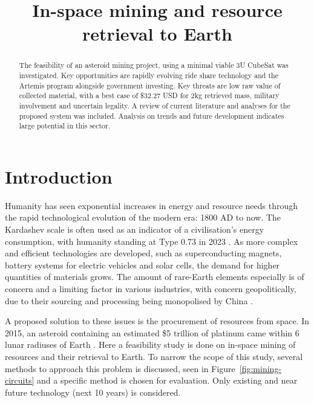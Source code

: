 \documentclass[conference]{IEEEtran}
\begin{document}
\title{In-space mining and resource retrieval to Earth}

\author{
}

\maketitle

\begin{abstract}
The feasibility of an asteroid mining project, using a minimal viable 3U CubeSat was investigated. Key opportunities are rapidly evolving ride share technology and the Artemis program alongside government investing. Key threats are low raw value of collected material, with a best case of \$32.27 USD for 2kg retrieved mass, military involvement and uncertain legality. A review of current literature and analyses for the proposed system was included. Analysis on trends and future development indicates large potential in this sector.
\end{abstract}

\section{Introduction}
Humanity has seen exponential increases in energy and resource needs through the rapid technological evolution of the modern era: 1800 AD to now. The Kardashev scale \cite{1964SvA.....8..217K} is often used as an indicator of a civilisation's energy consumption, with humanity standing at Type 0.73 in 2023 \cite{Zhang2023}. As more complex and efficient technologies are developed, such as superconducting magnets, battery systems for electric vehicles and solar cells, the demand for higher quantities of materials grows. The amount of rare-Earth elements especially is of concern and a limiting factor in various industries, with concern geopolitically, due to their sourcing and processing being monopolised by China \cite{baskaran-2024}.

A proposed solution to these issues is the procurement of resources from space. In 2015, an asteroid containing an estimated \$5 trillion of platinum came within 6 lunar radiuses of Earth \cite{javelosa-2015}. Here a feasibility study is done on in-space mining of resources and their retrieval to Earth. To narrow the scope of this study, several methods to approach this problem is discussed, seen in Figure~\ref{fig:mining-circuits} and a specific method is chosen for evaluation. Only existing and near future technology (next 10 years) is considered.
\end{document}
